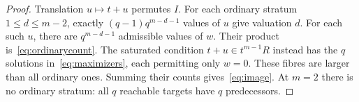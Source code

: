 \begin{proof}
Translation $u\mapsto t+u$ permutes $I$. For each ordinary stratum
$1\leq d\leq m-2$, exactly $(q-1)q^{m-d-1}$ values of $u$ give valuation
$d$. For each such $u$, there are $q^{m-d-1}$ admissible values of $w$.
Their product is~\eqref{eq:ordinarycount}. The saturated condition
$t+u\in t^{m-1}R$ instead has the $q$ solutions in~\eqref{eq:maximizers},
each permitting only $w=0$. These fibres are larger than all ordinary
ones. Summing their counts gives~\eqref{eq:image}. At $m=2$ there is no
ordinary stratum: all $q$ reachable targets have $q$ predecessors.
\end{proof}
